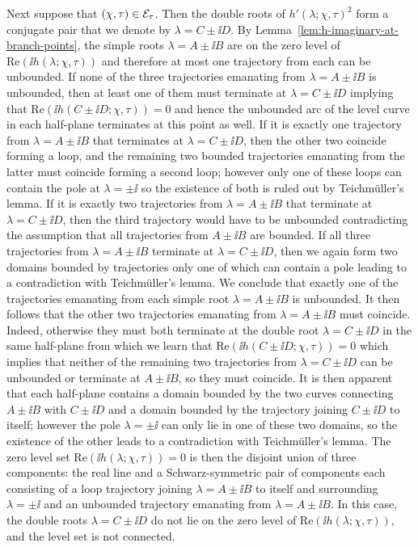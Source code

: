Next suppose that $(\chi,\tau)\in \mathcal{E}_\tau$.  Then the double roots of $h'(\lambda;\chi,\tau)^2$ form a conjugate pair that we denote by $\lambda=C\pm\ii D$.  By Lemma~\ref{lem:h-imaginary-at-branch-points}, the simple roots $\lambda=A\pm\ii B$ are on the zero level of $\mathrm{Re}(\ii h(\lambda;\chi,\tau))$ and therefore at most one trajectory from each can be unbounded.  If none of the three trajectories emanating from $\lambda=A\pm\ii B$ is unbounded, then at least one of them must terminate at $\lambda=C\pm\ii D$ implying that $\mathrm{Re}(\ii h(C\pm\ii D;\chi,\tau))=0$ and hence the unbounded arc of the level curve in each half-plane terminates at this point as well.  If it is exactly one trajectory from $\lambda=A\pm\ii B$ that terminates at $\lambda=C\pm\ii D$, then the other two coincide forming a loop, and the remaining two bounded trajectories emanating from the latter must coincide forming a second loop; however only one of these loops can contain the pole at $\lambda=\pm\ii$ so the existence of both is ruled out by Teichm\"uller's lemma.  If it is exactly two trajectories from $\lambda=A\pm\ii B$ that terminate at $\lambda=C\pm\ii D$, then the third trajectory would have to be unbounded contradicting the assumption that all trajectories from $A\pm\ii B$ are bounded.  If all three trajectories from $\lambda=A\pm\ii B$ terminate at $\lambda=C\pm\ii D$, then we again form two domains bounded by trajectories only one of which can contain a pole leading to a contradiction with Teichm\"uller's lemma.  We conclude that exactly one of the trajectories emanating from each simple root $\lambda=A\pm\ii B$ is unbounded.  
It then follows that the other two trajectories emanating from $\lambda=A\pm\ii B$ must coincide.  Indeed, otherwise they must both terminate at the double root $\lambda=C\pm\ii D$ in the same half-plane from which we learn that $\mathrm{Re}(\ii h(C\pm\ii D;\chi,\tau))=0$ which implies that neither of the remaining two trajectories from $\lambda=C\pm\ii D$ can be unbounded or terminate at $A\pm\ii B$, so they must coincide.  It is then apparent that each half-plane contains a domain bounded by the two curves connecting $A\pm\ii B$ with $C\pm\ii D$ and a domain bounded by the trajectory joining $C\pm\ii D$ to itself; however the pole $\lambda=\pm\ii$ can only lie in one of these two domains, so the existence of the other leads to a contradiction with Teichm\"uller's lemma. The zero level set $\mathrm{Re}(\ii h(\lambda;\chi,\tau))=0$ is then the disjoint union of three components:  the real line and a Schwarz-symmetric pair of components each consisting of a loop trajectory joining $\lambda=A\pm\ii B$ to itself and surrounding $\lambda=\pm\ii$ and an unbounded trajectory emanating from $\lambda=A\pm\ii B$.  In this case, the double roots $\lambda=C\pm\ii D$ do not lie on the zero level of $\mathrm{Re}(\ii h(\lambda;\chi,\tau))$, and the level set is not connected. 